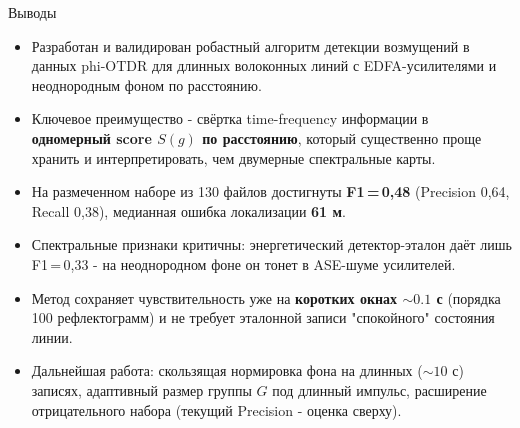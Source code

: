 \documentclass[aspectratio=169,11pt]{beamer}
\begin{document}
\begin{frame}{Выводы}
    \begin{itemize}
        \item Разработан и валидирован робастный алгоритм детекции возмущений в данных phi-OTDR для длинных волоконных линий с EDFA-усилителями и неоднородным фоном по расстоянию.
        \item Ключевое преимущество - свёртка time-frequency информации в \textbf{одномерный score $S(g)$ по расстоянию}, который существенно проще хранить и интерпретировать, чем двумерные спектральные карты.
        \item На размеченном наборе из 130 файлов достигнуты \textbf{F1\,=\,0{,}48} (Precision 0{,}64, Recall 0{,}38), медианная ошибка локализации \textbf{61 м}.
        \item Спектральные признаки критичны: энергетический детектор-эталон даёт лишь F1\,=\,0{,}33 - на неоднородном фоне он тонет в ASE-шуме усилителей.
        \item Метод сохраняет чувствительность уже на \textbf{коротких окнах ${\sim}0.1$ с} (порядка 100 рефлектограмм) и не требует эталонной записи "спокойного" состояния линии.
        \item Дальнейшая работа: скользящая нормировка фона на длинных (${\sim}10$ с) записях, адаптивный размер группы $G$ под длинный импульс, расширение отрицательного набора (текущий Precision - оценка сверху).
    \end{itemize}
\end{frame}

\appendix
\end{document}
